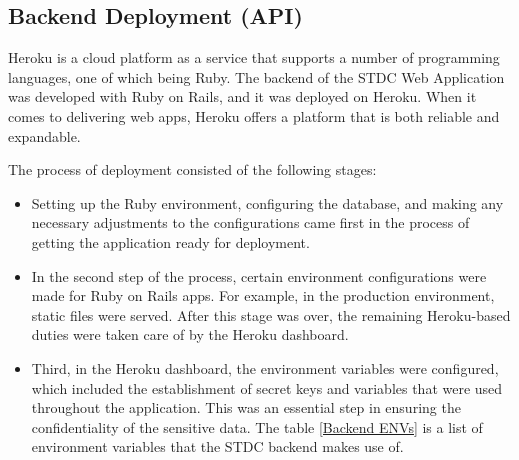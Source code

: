 \subsection{Backend Deployment (API)}
\begin{justify}
    Heroku is a cloud platform as a service that supports a number of programming languages, one of which being Ruby. The backend of the STDC Web Application was developed with Ruby on Rails, and it was deployed on Heroku. When it comes to delivering web apps, Heroku offers a platform that is both reliable and expandable.
    
    \vspace{0.25cm}
    \newendline The process of deployment consisted of the following stages:
\clearpage
    \begin{itemize}
        \item Setting up the Ruby environment, configuring the database, and making any necessary adjustments to the configurations came first in the process of getting the application ready for deployment.\\

         \item In the second step of the process, certain environment configurations were made for Ruby on Rails apps. For example, in the production environment, static files were served. After this stage was over, the remaining Heroku-based duties were taken care of by the Heroku dashboard.\\
    
        \item Third, in the Heroku dashboard, the environment variables were configured, which included the establishment of secret keys and variables that were used throughout the application. This was an essential step in ensuring the confidentiality of the sensitive data. The table \ref{Backend ENVs} is a list of environment variables that the STDC backend makes use of.\\


\end{itemize}
\end{justify}
